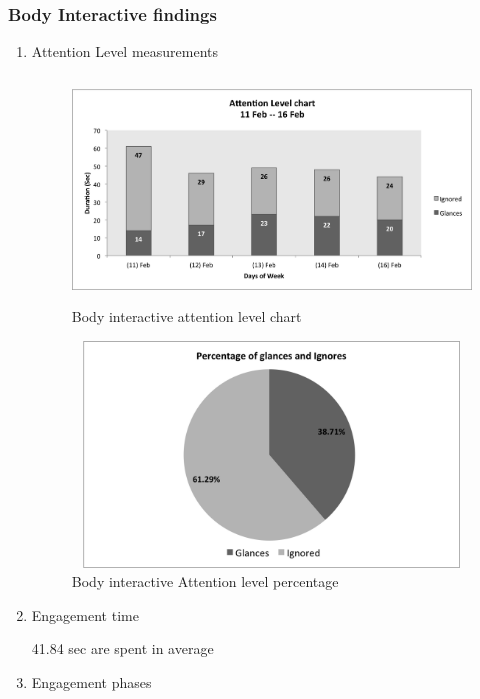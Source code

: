 \subsubsection{Body Interactive findings}

\begin{enumerate}
\item Attention Level measurements


\begin{figure}[H]
    \centering
    \includegraphics[width=110mm,height=60mm]{Figures/8/body_inter_findings/Body_Inter_chart}%
    \caption{Body interactive attention level chart}%
    \label{fig:bodyattentionlevelchart}%
\end{figure}


\begin{figure}[H]
    \centering
    \includegraphics[width=110mm,height=60mm]{Figures/8/body_inter_findings/body_inter_percentage}
    \caption{Body interactive Attention level percentage}%
    \label{fig:bodyattentionlevelpercentage}%
\end{figure}



\item Engagement time

41.84 sec are spent in average



\item Engagement phases


\end{enumerate}
